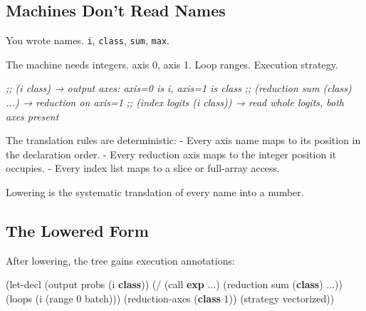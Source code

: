 \documentclass[11pt,titlepage]{article}
\newenvironment{Shaded}{}{}
\newcommand{\CommentTok}[1]{\textcolor[rgb]{0.38,0.63,0.69}{\textit{#1}}}
\newcommand{\DecValTok}[1]{\textcolor[rgb]{0.25,0.63,0.44}{#1}}
\newcommand{\KeywordTok}[1]{\textcolor[rgb]{0.00,0.44,0.13}{\textbf{#1}}}
\newcommand{\NormalTok}[1]{#1}
\newcommand{\OperatorTok}[1]{\textcolor[rgb]{0.40,0.40,0.40}{#1}}
\begin{document}
\vspace{2em}

\hypertarget{machines-dont-read-names}{%
\subsection{Machines Don't Read Names}\label{machines-dont-read-names}}

You wrote names. \texttt{i}, \texttt{class}, \texttt{sum}, \texttt{max}.

The machine needs integers. axis 0, axis 1. Loop ranges. Execution
strategy.

\begin{Shaded}
\begin{Highlighting}[]
\CommentTok{;; (i class) → output axes: axis=0 is i, axis=1 is class}
\CommentTok{;; (reduction sum (class) ...) → reduction on axis=1}
\CommentTok{;; (index logits (i class)) → read whole logits, both axes present}
\end{Highlighting}
\end{Shaded}

The translation rules are deterministic: - Every axis name maps to its
position in the declaration order. - Every reduction axis maps to the
integer position it occupies. - Every index list maps to a slice or
full-array access.

Lowering is the systematic translation of every name into a number.

\vspace{2em}

\hypertarget{the-lowered-form}{%
\subsection{The Lowered Form}\label{the-lowered-form}}

After lowering, the tree gains execution annotations:

\begin{Shaded}
\begin{Highlighting}[]
\NormalTok{(let-decl (output probs (i }\KeywordTok{class}\NormalTok{))}
\NormalTok{  (}\OperatorTok{/}\NormalTok{ (call }\KeywordTok{exp}\NormalTok{ ...) (reduction sum (}\KeywordTok{class}\NormalTok{) ...))}
\NormalTok{  (loops (i (range }\DecValTok{0}\NormalTok{ batch)))}
\NormalTok{  (reduction-axes (}\KeywordTok{class} \DecValTok{1}\NormalTok{))}
\NormalTok{  (strategy vectorized))}
\end{Highlighting}
\end{Shaded}
\end{document}
